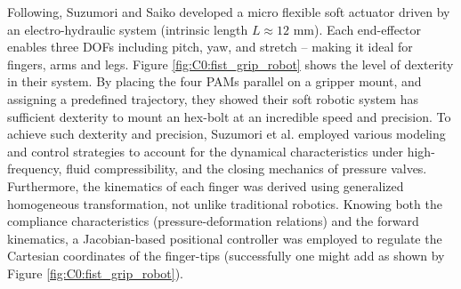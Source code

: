 Following, Suzumori and Saiko \cite{Suzumori1991,Suzumori1992} developed a micro flexible soft actuator driven by an electro-hydraulic system (intrinsic length $L \approx12$ \si{\milli \meter}). Each end-effector enables three DOFs including pitch, yaw, and stretch -- making it ideal for fingers, arms and legs. Figure \ref{fig:C0:fist_grip_robot} shows the level of dexterity in their system. By placing the four PAMs parallel on a gripper mount, and assigning a predefined trajectory, they showed their soft robotic system has sufficient dexterity to mount an hex-bolt at an incredible speed and precision. To achieve such dexterity and precision, Suzumori et al. \cite{Suzumori1991} employed various modeling and control strategies to account for the dynamical characteristics under high-frequency, fluid compressibility, and the closing mechanics of pressure valves. Furthermore, the kinematics of each finger was derived using generalized homogeneous transformation, not unlike traditional robotics. Knowing both the compliance characteristics (pressure-deformation relations) and the forward kinematics, a Jacobian-based positional controller was employed to regulate the Cartesian coordinates of the finger-tips (successfully one might add as shown by Figure \ref{fig:C0:fist_grip_robot}). \\[0.1em]
%

